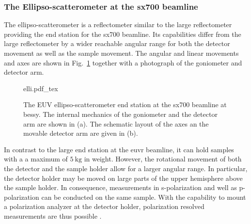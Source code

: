 \subsubsection{The Ellipso-scatterometer at the \gls{sx700} beamline}
The ellipso-scatterometer is a reflectometer similar to the large reflectometer providing the end station for the \gls{sx700} beamline. Its capabilities differ from the large reflectometer by a wider reachable angular range for both the detector movement as well as the sample movement. The angular and linear movements and axes are shown in Fig.~\ref{ch_exp:fig_elli} together with a photograph of the goniometer and detector arm.
\begin{figure}[htb]
    \def\svgwidth{\textwidth}
    {elli.pdf_tex}
    \caption[The EUV ellipso-scatterometer.]{The EUV ellipso-scatterometer end station at the \gls{sx700} beamline at \gls{bessy}. The internal mechanics of the goniometer and the detector arm are shown in (a). The schematic layout of the axes an the movable detector arm are given in (b).}
    \label{ch_exp:fig_elli}
\end{figure}
In contrast to the large end station at the \gls{euvr} beamline, it can hold samples with a a maximum of $\SI{5}{\kg}$ in weight. However, the rotational movement of both the detector and the sample holder allow for a larger angular range. In particular, the detector holder may be moved on large parts of the upper hemisphere above the sample holder. In consequence, measurements in s-polarization and well as p-polarization can be conducted on the same sample. With the capability to mount a polarization analyzer at the detector holder, polarization resolved measurements are thus possible \cite{soltwisch_polarization_2015}.

